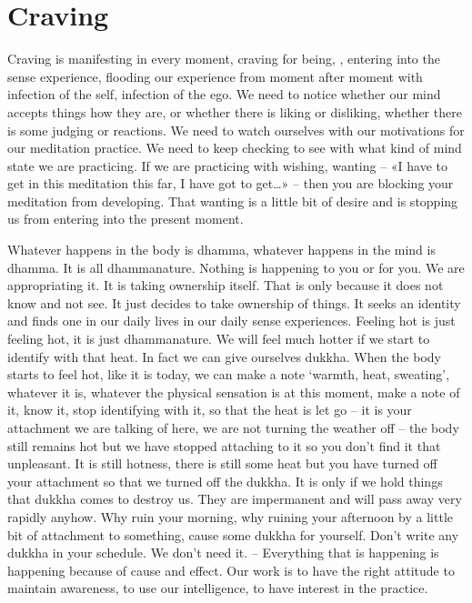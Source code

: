 \documentclass[letterpaper,10pt,english]{sphinxmanual}
\begin{document}
\section{Craving}
\label{\detokenize{4-b:craving}}
\sphinxAtStartPar
{}  Craving  is  manifesting  in  every  moment,  craving  for  being,
,  entering  into  the  sense  experience,  flooding  our  experience  from
moment  after  moment  with  infection  of  the  self,  infection  of  the  ego. We
need  to  notice  whether  our  mind  accepts  things  how  they  are,  or  whether
there is liking or disliking, whether there is some judging or reactions. We
need  to  watch  ourselves  with  our  motivations  for  our  meditation  practice.
We need to keep checking to see with what kind of mind state we are practicing. If we are practicing with wishing, wanting – «I have to get in this meditation this far, I have got to get…» – then you are blocking your meditation
from developing. That wanting is a little bit of desire and is stopping us from
entering into the present moment.

\sphinxAtStartPar
Whatever  happens  in  the  body  is  dhamma,  whatever  happens  in  the
mind is dhamma. It is all dhamma\sphinxhyphen{}nature. Nothing is happening to you or
for you. We are appropriating it. It is taking ownership itself. That is only
because it does not know and not see. It just decides to take ownership of
things. It seeks an identity and finds one in our daily lives in our daily sense
experiences. Feeling hot is just feeling hot, it is just dhamma\sphinxhyphen{}nature. We will
feel much hotter if we start to identify with that heat. In fact we can give ourselves dukkha. When the body starts to feel hot, like it is today, we can make
a note ‘warmth, heat, sweating’, whatever it is, whatever the physical sensation is at this moment, make a note of it, know it, stop identifying with it, so
that the heat is let go – it is your attachment we are talking of here, we are
not turning the weather off – the body still remains hot but we have stopped
attaching to it so you don’t find it that unpleasant. It is still hotness, there is
still some heat but you have turned off your attachment so that we turned
off the dukkha. It is only if we hold things that dukkha comes to destroy us.
They are
impermanent and will pass away very rapidly anyhow. Why ruin your morning, why ruining your afternoon by a little bit of attachment to something,
cause some dukkha for yourself. Don’t write any dukkha in your schedule.
We  don’t  need  it.  –  Everything  that  is  happening  is  happening  because  of
cause and effect. Our work is to have the right attitude to maintain awareness, to use our intelligence, to have interest in the practice.
\end{document}
